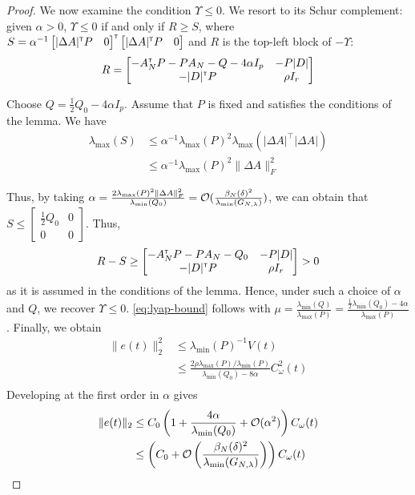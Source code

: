 \documentclass{article}
\begin{document}
\begin{proof}
	We now examine the condition $\Upsilon \leq 0$.
	We resort to its Schur complement: given $\alpha > 0$, $\Upsilon \leq 0$ if and only if $R \geq S$, where $S= \alpha^{-1}\begin{bmatrix}|\Delta A|^{\mathsf{\scriptscriptstyle T}} P & 0\end{bmatrix}^{\mathsf{\scriptscriptstyle T}} \begin{bmatrix}|\Delta A|^{\mathsf{\scriptscriptstyle T}} P & 0\end{bmatrix}$ and $R$ is the top-left block of $-\Upsilon$:
	\[R = \begin{bmatrix}
	-A_N^{\mathsf{\scriptscriptstyle T}} P - P A_N - Q - 4\alpha I_p & -P|D|\\
	-|D|^{\mathsf{\scriptscriptstyle T}} P & \rho I_r\\
	\end{bmatrix}\]
	
	Choose $Q = \frac{1}{2}Q_0-4\alpha I_p$.
	Assume that $P$ is fixed and satisfies the conditions of the lemma. We have 
	\begin{align*}
	\lambda_{\max}(S) &\leq \alpha^{-1}\lambda_{\max}(P)^2\lambda_{\max}(|\Delta A|^\top |\Delta A|)\\
	&\leq\alpha^{-1}\lambda_{\max}(P)^2\|\Delta A\|_F^2
	\end{align*}

	
	Thus, by taking $\alpha = \frac{2\lambda_{\max}(P)^2\|\Delta A\|_F^2}{\lambda_{\min}(Q_0)} = \mathcal{O}({\frac{\beta_N(\delta)^2}{\lambda_{\min}(G_{N,\lambda})}})$, we can obtain that $S \leq \begin{bmatrix}
	\frac{1}{2}Q_0 & 0\\0 & 0
	\end{bmatrix}$. Thus,
	\[R-S \geq \begin{bmatrix}
	-A_N^{\mathsf{\scriptscriptstyle T}} P - P A_N - Q_0 & -P|D|\\
	-|D|^{\mathsf{\scriptscriptstyle T}} P & \rho I_r\\
	\end{bmatrix} > 0 \]
	as it is assumed in the conditions of the lemma. Hence, under such a choice of $\alpha$ and $Q$, we recover $\Upsilon\leq 0$. \eqref{eq:lyap-bound} follows with $\mu = \frac{\lambda_{\min}(Q)}{\lambda_{\max}(P)} = \frac{\frac{1}{2}\lambda_{\min}(Q_0) - 4\alpha}{\lambda_{\max}(P)}$.
	Finally, we obtain
	\begin{align*}
	\|e(t)\|_2^2 &\leq \lambda_{\min}(P)^{-1} V(t)\\
	& \leq \frac{2\rho\lambda_{\max}(P)/\lambda_{\min}(P)}{\lambda_{\min}(Q_0) - 8\alpha} C_\omega^2(t)\\
	\end{align*}
	Developing at the first order in $\alpha$ gives
	\begin{align*}
	\|e(t)\|_2 &\leq C_0\left(1 + \frac{4\alpha}{\lambda_{\min}(Q_0)} + \mathcal{O}(\alpha^2)\right)C_\omega(t)\\
	&\leq \left(C_0 + \mathcal{O}\left({\frac{\beta_N(\delta)^2}{\lambda_{\min}(G_{N,\lambda})}}\right)\right)C_\omega(t)
	\end{align*}
\end{proof}
\end{document}
